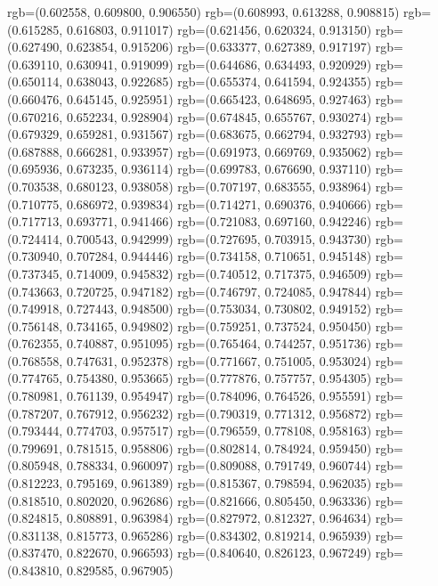 {{{					rgb=(0.602558, 0.609800, 0.906550)
					rgb=(0.608993, 0.613288, 0.908815)
					rgb=(0.615285, 0.616803, 0.911017)
					rgb=(0.621456, 0.620324, 0.913150)
					rgb=(0.627490, 0.623854, 0.915206)
					rgb=(0.633377, 0.627389, 0.917197)
					rgb=(0.639110, 0.630941, 0.919099)
					rgb=(0.644686, 0.634493, 0.920929)
					rgb=(0.650114, 0.638043, 0.922685)
					rgb=(0.655374, 0.641594, 0.924355)
					rgb=(0.660476, 0.645145, 0.925951)
					rgb=(0.665423, 0.648695, 0.927463)
					rgb=(0.670216, 0.652234, 0.928904)
					rgb=(0.674845, 0.655767, 0.930274)
					rgb=(0.679329, 0.659281, 0.931567)
					rgb=(0.683675, 0.662794, 0.932793)
					rgb=(0.687888, 0.666281, 0.933957)
					rgb=(0.691973, 0.669769, 0.935062)
					rgb=(0.695936, 0.673235, 0.936114)
					rgb=(0.699783, 0.676690, 0.937110)
					rgb=(0.703538, 0.680123, 0.938058)
					rgb=(0.707197, 0.683555, 0.938964)
					rgb=(0.710775, 0.686972, 0.939834)
					rgb=(0.714271, 0.690376, 0.940666)
					rgb=(0.717713, 0.693771, 0.941466)
					rgb=(0.721083, 0.697160, 0.942246)
					rgb=(0.724414, 0.700543, 0.942999)
					rgb=(0.727695, 0.703915, 0.943730)
					rgb=(0.730940, 0.707284, 0.944446)
					rgb=(0.734158, 0.710651, 0.945148)
					rgb=(0.737345, 0.714009, 0.945832)
					rgb=(0.740512, 0.717375, 0.946509)
					rgb=(0.743663, 0.720725, 0.947182)
					rgb=(0.746797, 0.724085, 0.947844)
					rgb=(0.749918, 0.727443, 0.948500)
					rgb=(0.753034, 0.730802, 0.949152)
					rgb=(0.756148, 0.734165, 0.949802)
					rgb=(0.759251, 0.737524, 0.950450)
					rgb=(0.762355, 0.740887, 0.951095)
					rgb=(0.765464, 0.744257, 0.951736)
					rgb=(0.768558, 0.747631, 0.952378)
					rgb=(0.771667, 0.751005, 0.953024)
					rgb=(0.774765, 0.754380, 0.953665)
					rgb=(0.777876, 0.757757, 0.954305)
					rgb=(0.780981, 0.761139, 0.954947)
					rgb=(0.784096, 0.764526, 0.955591)
					rgb=(0.787207, 0.767912, 0.956232)
					rgb=(0.790319, 0.771312, 0.956872)
					rgb=(0.793444, 0.774703, 0.957517)
					rgb=(0.796559, 0.778108, 0.958163)
					rgb=(0.799691, 0.781515, 0.958806)
					rgb=(0.802814, 0.784924, 0.959450)
					rgb=(0.805948, 0.788334, 0.960097)
					rgb=(0.809088, 0.791749, 0.960744)
					rgb=(0.812223, 0.795169, 0.961389)
					rgb=(0.815367, 0.798594, 0.962035)
					rgb=(0.818510, 0.802020, 0.962686)
					rgb=(0.821666, 0.805450, 0.963336)
					rgb=(0.824815, 0.808891, 0.963984)
					rgb=(0.827972, 0.812327, 0.964634)
					rgb=(0.831138, 0.815773, 0.965286)
					rgb=(0.834302, 0.819214, 0.965939)
					rgb=(0.837470, 0.822670, 0.966593)
					rgb=(0.840640, 0.826123, 0.967249)
					rgb=(0.843810, 0.829585, 0.967905)
}}}
